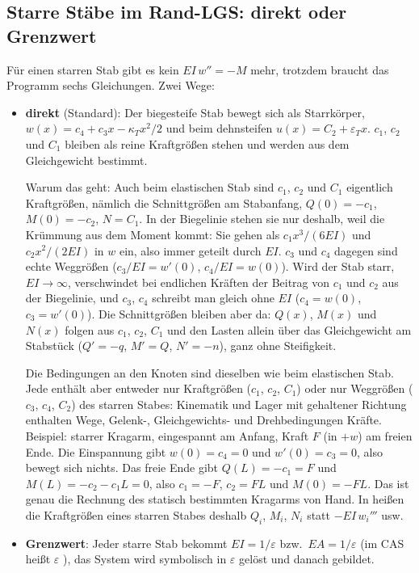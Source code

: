 \subsection{Starre Stäbe im Rand-LGS: direkt oder Grenzwert}

Für einen starren Stab gibt es kein $EI\,w'' = -M$ mehr, trotzdem braucht das Programm sechs
Gleichungen. Zwei Wege:

\begin{itemize}
  \item \textbf{direkt} (Standard): Der biegesteife Stab bewegt sich als Starrkörper,
        $w(x) = c_4 + c_3 x - \kappa_T x^2/2$ und beim dehnsteifen $u(x) = C_2 + \varepsilon_T x$.
        $c_1$, $c_2$ und $C_1$ bleiben als reine Kraftgrößen stehen und werden aus dem
        Gleichgewicht bestimmt.

        Warum das geht: Auch beim elastischen Stab sind $c_1$, $c_2$ und $C_1$ eigentlich
        Kraftgrößen, nämlich die Schnittgrößen am Stabanfang, $Q(0) = -c_1$, $M(0) = -c_2$,
        $N = C_1$. In der Biegelinie stehen sie nur deshalb, weil die Krümmung aus dem Moment kommt:
        Sie gehen als $c_1 x^3/(6EI)$ und $c_2 x^2/(2EI)$ in $w$ ein, also immer geteilt durch
        $EI$. $c_3$ und $c_4$ dagegen sind echte Weggrößen ($c_3/EI = w'(0)$, $c_4/EI = w(0)$).
        Wird der Stab starr, $EI \to \infty$, verschwindet bei endlichen Kräften der Beitrag von
        $c_1$ und $c_2$ aus der Biegelinie, und $c_3$, $c_4$ schreibt man gleich ohne $EI$
        ($c_4 = w(0)$, $c_3 = w'(0)$). Die Schnittgrößen bleiben aber da: $Q(x)$, $M(x)$ und $N(x)$
        folgen aus $c_1$, $c_2$, $C_1$ und den Lasten allein über das Gleichgewicht am Stabstück
        ($Q' = -q$, $M' = Q$, $N' = -n$), ganz ohne Steifigkeit.

        Die Bedingungen an den Knoten sind dieselben wie beim elastischen Stab. Jede enthält aber
        entweder nur Kraftgrößen ($c_1$, $c_2$, $C_1$) oder nur Weggrößen ($c_3$, $c_4$, $C_2$) des
        starren Stabes: Kinematik und Lager mit gehaltener Richtung enthalten Wege, Gelenk-,
        Gleichgewichts- und Drehbedingungen Kräfte. Beispiel: starrer Kragarm, eingespannt am
        Anfang, Kraft $F$ (in $+w$) am freien Ende. Die Einspannung gibt $w(0) = c_4 = 0$ und
        $w'(0) = c_3 = 0$, also bewegt sich nichts. Das freie Ende gibt $Q(L) = -c_1 = F$ und
        $M(L) = -c_2 - c_1 L = 0$, also $c_1 = -F$, $c_2 = F L$ und $M(0) = -F L$. Das ist genau die
        Rechnung des statisch bestimmten Kragarms von Hand. In  heißen die
        Kraftgrößen eines starren Stabes deshalb $Q_i$, $M_i$, $N_i$ statt $-EI\,w_i'''$ usw.
  \item \textbf{Grenzwert}: Jeder starre Stab bekommt $EI = 1/\varepsilon$ bzw.\
        $EA = 1/\varepsilon$ (im CAS heißt $\varepsilon$ ), das System wird symbolisch in
        $\varepsilon$ gelöst und danach \code{limit(\dots, rleps, 0)} gebildet.
\end{itemize}

